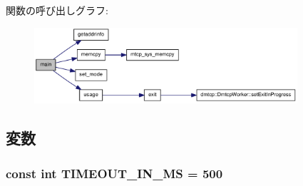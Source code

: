 関数の呼び出しグラフ:\nopagebreak
\begin{figure}[H]
\begin{center}
\leavevmode
\includegraphics[width=277pt]{rdma-client_8c_a3c04138a5bfe5d72780bb7e82a18e627_cgraph}
\end{center}
\end{figure}


\subsection{変数}
\hypertarget{rdma-client_8c_a76e9fc9cbd322318bf712c4077ca9251}{
\subsubsection[{TIMEOUT\_\-IN\_\-MS}]{\setlength{\rightskip}{0pt plus 5cm}const int {\bf TIMEOUT\_\-IN\_\-MS} = 500}}
\label{rdma-client_8c_a76e9fc9cbd322318bf712c4077ca9251}

